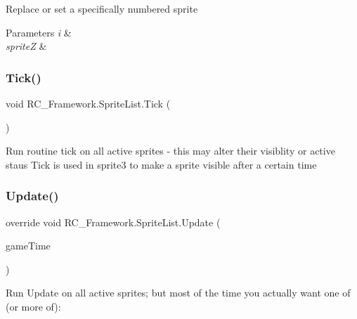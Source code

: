 Replace or set a specifically numbered sprite 


\begin{DoxyParams}{Parameters}
{\em i} & \\
\hline
{\em spriteZ} & \\
\hline
\end{DoxyParams}
\mbox{\label{class_r_c___framework_1_1_sprite_list_af36a07386a5b0f32a74473890868b3fc}} 
\subsubsection{\texorpdfstring{Tick()}{Tick()}}
{\footnotesize\ttfamily void R\+C\+\_\+\+Framework.\+Sprite\+List.\+Tick (\begin{DoxyParamCaption}{ }\end{DoxyParamCaption})}



Run routine tick on all active sprites -\/ this may alter their visiblity or active staus Tick is used in sprite3 to make a sprite visible after a certain time 

\mbox{\label{class_r_c___framework_1_1_sprite_list_a816100deff7ad173c33904ac59f3ad79}} 
\subsubsection{\texorpdfstring{Update()}{Update()}}
{\footnotesize\ttfamily override void R\+C\+\_\+\+Framework.\+Sprite\+List.\+Update (\begin{DoxyParamCaption}\item[{Game\+Time}]{game\+Time }\end{DoxyParamCaption})\hspace{0.3cm}{\ttfamily [virtual]}}



Run Update on all active sprites; but most of the time you actually want one of (or more of)\+: 

